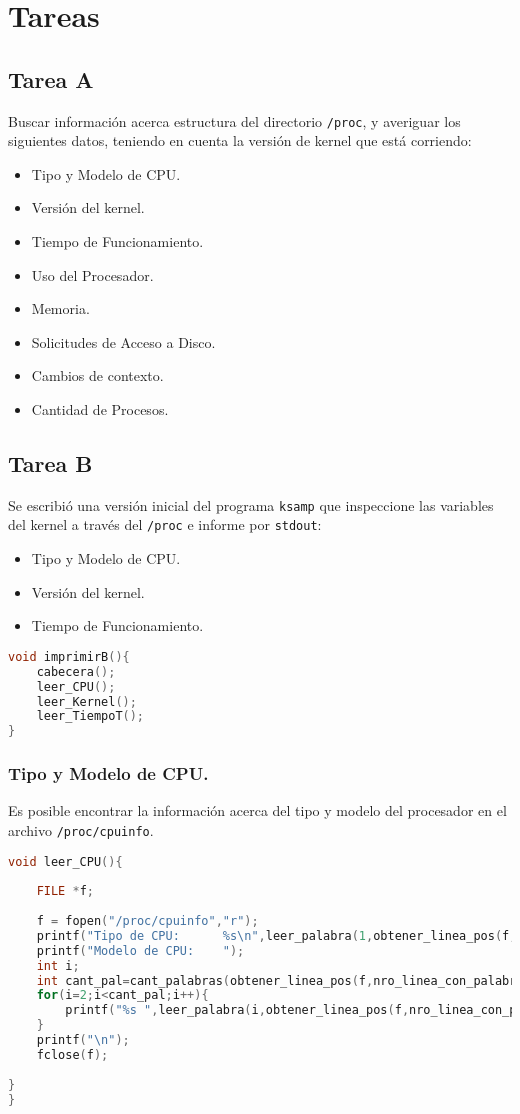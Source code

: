 \documentclass{article}
\begin{document}
\section{Tareas}
\subsection{Tarea A}
Buscar información acerca estructura del directorio \verb+/proc+, y averiguar los siguientes datos, teniendo en cuenta la versión de kernel que está corriendo:
\begin{itemize}
\item Tipo y Modelo de CPU.
\item Versión del kernel.
\item Tiempo de Funcionamiento.
\item Uso del Procesador.
\item Memoria.
\item Solicitudes de Acceso a Disco.
\item Cambios de contexto.
\item Cantidad de Procesos.
\end{itemize}
\subsection{Tarea B}
Se escribió una versión inicial del programa \verb+ksamp+ que inspeccione las variables del kernel a través del \verb+/proc+ e informe por \verb+stdout+:
 
\begin{itemize}
\item Tipo y Modelo de CPU.
\item Versión del kernel.
\item Tiempo de Funcionamiento.
\end{itemize}
{\fontfamily{\ttdefault}\selectfont
\begin{lstlisting}[language=c,caption=Función imprimirB()., tabsize=2] 
void imprimirB(){
	cabecera();
	leer_CPU();
	leer_Kernel();
	leer_TiempoT();
}
\end{lstlisting}}
\subsubsection*{Tipo y Modelo de CPU.}
Es posible encontrar la información acerca del tipo y modelo del procesador en el archivo \verb+/proc/cpuinfo+.
{\fontfamily{\ttdefault}\selectfont
\begin{lstlisting}[language=c,caption=Función leer\_CPU()., breaklines=true] 
void leer_CPU(){
	
	FILE *f;
	
	f = fopen("/proc/cpuinfo","r");
	printf("Tipo de CPU:      %s\n",leer_palabra(1,obtener_linea_pos(f,nro_linea_con_palabra(f,"vendor_id"))));
	printf("Modelo de CPU:    ");
	int i;
	int cant_pal=cant_palabras(obtener_linea_pos(f,nro_linea_con_palabra(f,"model name")));
	for(i=2;i<cant_pal;i++){
		printf("%s ",leer_palabra(i,obtener_linea_pos(f,nro_linea_con_palabra(f,"model name"))));
	}
	printf("\n");
	fclose(f);
	
}
}
\end{lstlisting}}
\end{document}
